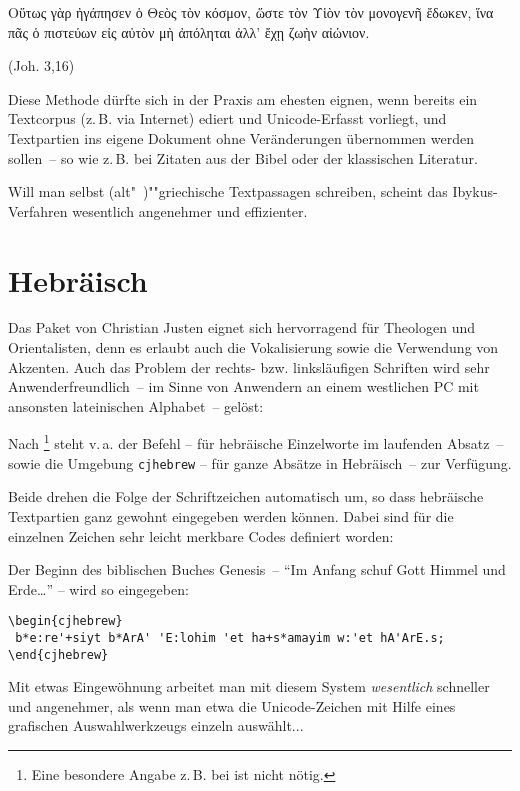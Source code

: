 \begin{otherlanguage}{polutonikogreek}
Οὕτως γὰρ ἠγάπησεν ὁ Θεὸς τὸν κόσμον, ὥστε τὸν Υἱὸν τὸν μονογενῆ ἔδωκεν,
ἵνα πᾶς ὁ πιστεύων εἰς αὐτὸν μὴ ἀπόληται ἀλλ’ ἔχῃ ζωὴν αἰώνιον.
\end{otherlanguage}
(Joh. 3,16)

Diese Methode dürfte sich in der Praxis am ehesten eignen, wenn bereits ein Textcorpus
(z.\,B. via Internet) ediert und Unicode-Erfasst vorliegt, und Textpartien ins eigene Dokument
ohne Veränderungen übernommen werden sollen~-- so wie z.\,B. bei Zitaten aus der Bibel oder
der klassischen Literatur.

Will man selbst (alt"~)""griechische Textpassagen schreiben, scheint das Ibykus-Verfahren
wesentlich angenehmer und effizienter.


\section{Hebräisch}

Das Paket  von Christian Justen eignet sich hervorragend für
Theologen und Orientalisten, denn es erlaubt auch die Vokalisierung sowie die Verwendung
von Akzenten. Auch das Problem der rechts- bzw. linksläufigen Schriften wird sehr
Anwenderfreundlich~-- im Sinne von Anwendern an einem westlichen PC mit ansonsten
lateinischen Alphabet~-- gelöst:

Nach %
\footnote{Eine besondere Angabe z.\,B. bei  ist nicht nötig.}
steht v.\,a. der Befehl 
-- für hebräische Einzelworte im laufenden Absatz~-- sowie die
Umgebung \lstinline/cjhebrew/
-- für ganze Absätze in Hebräisch~-- zur Verfügung.

Beide drehen die Folge der Schriftzeichen automatisch um, so dass hebräische Textpartien
ganz gewohnt eingegeben werden können. Dabei sind für die einzelnen Zeichen sehr leicht
merkbare Codes definiert worden:

Der Beginn des biblischen Buches Genesis~-- \enquote{Im Anfang schuf Gott Himmel und Erde\dots} --
wird so eingegeben:

\begin{lstlisting}
\begin{cjhebrew}
 b*e:re'+siyt b*ArA' 'E:lohim 'et ha+s*amayim w:'et hA'ArE.s;
\end{cjhebrew}
\end{lstlisting}

Mit etwas Eingewöhnung arbeitet man mit diesem System \emph{wesentlich} schneller und
angenehmer, als wenn man etwa die Unicode-Zeichen mit Hilfe eines grafischen Auswahlwerkzeugs
einzeln auswählt...

